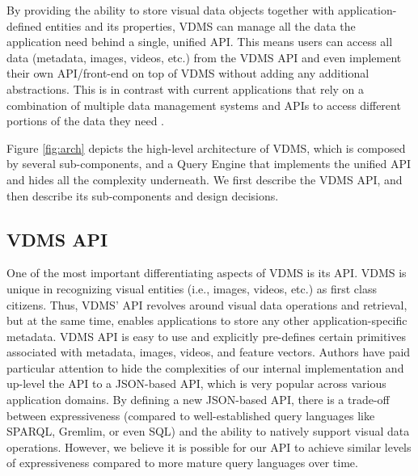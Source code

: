 By providing the ability to store visual data objects together with
application-defined entities and its properties, VDMS can manage
all the data the application need behind a single, unified API.
This means users can access all data (metadata, images, videos, etc.)
from the VDMS API and even implement their own API/front-end on top
of VDMS without adding any additional abstractions.
This is in contrast with current applications that rely on a combination
of multiple data management systems and APIs to access different
portions of the data they need
\cite{tao, sculley2015hidden, mayer2020scalable, sculley2015hidden}.

Figure \ref{fig:arch} depicts the high-level architecture of VDMS, which
is composed by several sub-components, and a Query Engine that implements
the unified API and hides all the complexity underneath.
We first describe the VDMS API, and then describe its sub-components
and design decisions.

\subsection{VDMS API}

One of the most important differentiating aspects of VDMS is its API.
VDMS is unique in recognizing visual entities (i.e., images, videos, etc.)
as first class citizens.
Thus, VDMS' API revolves around visual data operations and retrieval,
but at the same time, enables applications to store any other
application-specific metadata.
VDMS API is easy to use and explicitly pre-defines certain
primitives associated with metadata, images, videos, and feature vectors.
Authors have paid particular attention to hide the complexities of our internal
implementation and up-level the API to a JSON-based API,
which is very popular across various application domains.
By defining a new JSON-based API, there is a trade-off between expressiveness
(compared to well-established query languages like SPARQL, Gremlim, or even SQL)
and the ability to natively support visual data operations.
However, we believe it is possible for our API to achieve similar levels of
expressiveness compared to more mature query languages over time.

